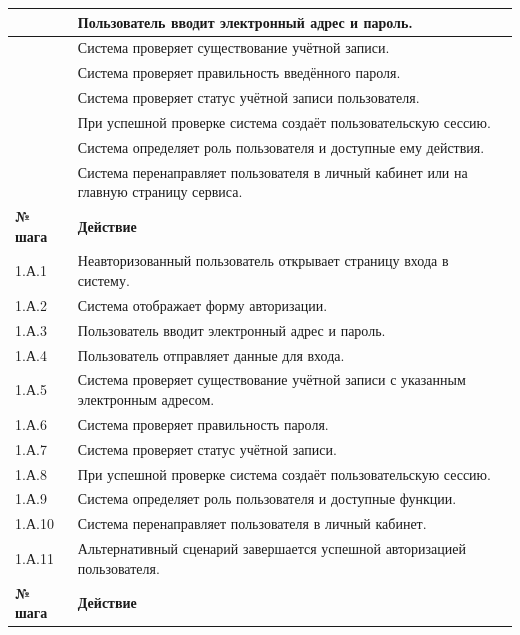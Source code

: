 \documentclass[12pt,a4paper]{article}
\begin{document}
\begin{xltabular}{\textwidth}{
			|>{\raggedright\arraybackslash}p{2.7cm}
			|>{\raggedright\arraybackslash}X|
		}
		 & Пользователь вводит электронный адрес и пароль. \\
		 & Система проверяет существование учётной записи. \\
		 & Система проверяет правильность введённого пароля. \\
		 & Система проверяет статус учётной записи пользователя. \\
		 & При успешной проверке система создаёт пользовательскую сессию. \\
		 & Система определяет роль пользователя и доступные ему действия. \\
		 & Система перенаправляет пользователя в личный кабинет или на главную
		страницу сервиса. \\
		\hline
		
		
		\textbf{№ шага} & \textbf{Действие} \\
		\hline
		
		1.А.1 & Неавторизованный пользователь открывает страницу входа в систему. \\
		\hline
		1.А.2 & Система отображает форму авторизации. \\
		\hline
		1.А.3 & Пользователь вводит электронный адрес и пароль. \\
		\hline
		1.А.4 & Пользователь отправляет данные для входа. \\
		\hline
		1.А.5 & Система проверяет существование учётной записи с указанным
		электронным адресом. \\
		\hline
		1.А.6 & Система проверяет правильность пароля. \\
		\hline
		1.А.7 & Система проверяет статус учётной записи. \\
		\hline
		1.А.8 & При успешной проверке система создаёт пользовательскую сессию. \\
		\hline
		1.А.9 & Система определяет роль пользователя и доступные функции. \\
		\hline
		1.А.10 & Система перенаправляет пользователя в личный кабинет. \\
		\hline
		1.А.11 & Альтернативный сценарий завершается успешной авторизацией пользователя. \\
		\hline
		
		
		\textbf{№ шага} & \textbf{Действие} \\
		\hline
		

\end{xltabular}
\end{document}
